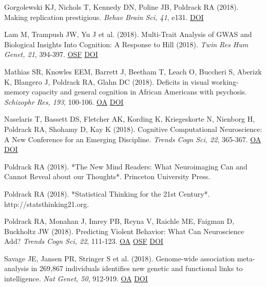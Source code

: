 \documentclass[10pt, letterpaper]{article}
\begin{document}
Gorgolewski KJ, Nichols T, Kennedy DN, Poline JB, Poldrack RA (2018). Making replication prestigious. \textit{Behav Brain Sci, 41}, e131. \href{http://dx.doi.org/10.1017/s0140525x18000663}{DOI} \vspace{2mm}

Lam M, Trampush JW, Yu J et al. (2018). Multi-Trait Analysis of GWAS and Biological Insights Into Cognition: A Response to Hill (2018). \textit{Twin Res Hum Genet, 21}, 394-397. \href{https://osf.io/t5kzx/}{OSF} \href{http://dx.doi.org/10.1017/thg.2018.46}{DOI} \vspace{2mm}

Mathias SR, Knowles EEM, Barrett J, Beetham T, Leach O, Buccheri S, Aberizk K, Blangero J, Poldrack RA, Glahn DC (2018). Deficits in visual working-memory capacity and general cognition in African Americans with psychosis. \textit{Schizophr Res, 193}, 100-106. \href{https://www.ncbi.nlm.nih.gov/pmc/articles/PMC5825248}{OA} \href{http://dx.doi.org/10.1016/j.schres.2017.08.015}{DOI} \vspace{2mm}

Naselaris T, Bassett DS, Fletcher AK, Kording K, Kriegeskorte N, Nienborg H, Poldrack RA, Shohamy D, Kay K (2018). Cognitive Computational Neuroscience: A New Conference for an Emerging Discipline. \textit{Trends Cogn Sci, 22}, 365-367. \href{https://www.ncbi.nlm.nih.gov/pmc/articles/PMC5911192}{OA} \href{http://dx.doi.org/10.1016/j.tics.2018.02.008}{DOI} \vspace{2mm}

Poldrack RA (2018).  *The New Mind Readers: What Neuroimaging Can and Cannot Reveal about our Thoughts*. Princeton University Press. \vspace{2mm}

Poldrack RA (2018).  *Statistical Thinking for the 21st Century*. http://statsthinking21.org. \vspace{2mm}

Poldrack RA, Monahan J, Imrey PB, Reyna V, Raichle ME, Faigman D, Buckholtz JW (2018). Predicting Violent Behavior: What Can Neuroscience Add? \textit{Trends Cogn Sci, 22}, 111-123. \href{https://www.ncbi.nlm.nih.gov/pmc/articles/PMC5794654}{OA} \href{https://osf.io/tgknp/}{OSF} \href{http://dx.doi.org/10.1016/j.tics.2017.11.003}{DOI} \vspace{2mm}

Savage JE, Jansen PR, Stringer S et al. (2018). Genome-wide association meta-analysis in 269,867 individuals identifies new genetic and functional links to intelligence. \textit{Nat Genet, 50}, 912-919. \href{https://www.ncbi.nlm.nih.gov/pmc/articles/PMC6411041}{OA} \href{http://dx.doi.org/10.1038/s41588-018-0152-6}{DOI} \vspace{2mm}
\end{document}
